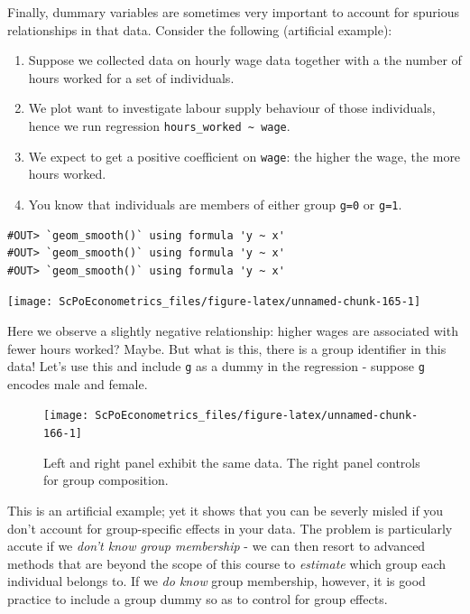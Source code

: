 \documentclass[]{book}
\providecommand{\tightlist}{%
  \setlength{\itemsep}{0pt}\setlength{\parskip}{0pt}}
\begin{document}
Finally, dummary variables are sometimes very important to account for spurious relationships in that data. Consider the following (artificial example):

\begin{enumerate}
\def\labelenumi{\arabic{enumi}.}
\tightlist
\item
  Suppose we collected data on hourly wage data together with a the number of hours worked for a set of individuals.
\item
  We plot want to investigate labour supply behaviour of those individuals, hence we run regression \texttt{hours\_worked\ \textasciitilde{}\ wage}.
\item
  We expect to get a positive coefficient on \texttt{wage}: the higher the wage, the more hours worked.
\item
  You know that individuals are members of either group \texttt{g=0} or \texttt{g=1}.
\end{enumerate}

\begin{verbatim}
#OUT> `geom_smooth()` using formula 'y ~ x'
#OUT> `geom_smooth()` using formula 'y ~ x'
#OUT> `geom_smooth()` using formula 'y ~ x'
\end{verbatim}

\begin{center}\texttt{[image: ScPoEconometrics\_files/figure-latex/unnamed-chunk-165-1]} \end{center}

Here we observe a slightly negative relationship: higher wages are associated with fewer hours worked? Maybe. But what is this, there is a group identifier in this data! Let's use this and include \texttt{g} as a dummy in the regression - suppose \texttt{g} encodes male and female.

\begin{figure}

{\centering \texttt{[image: ScPoEconometrics\_files/figure-latex/unnamed-chunk-166-1]} 

}

\caption{Left and right panel exhibit the same data. The right panel controls for group composition.}\label{fig:unnamed-chunk-166}
\end{figure}

This is an artificial example; yet it shows that you can be severly misled if you don't account for group-specific effects in your data. The problem is particularly accute if we \emph{don't know group membership} - we can then resort to advanced methods that are beyond the scope of this course to \emph{estimate} which group each individual belongs to. If we \emph{do know} group membership, however, it is good practice to include a group dummy so as to control for group effects.
\end{document}

